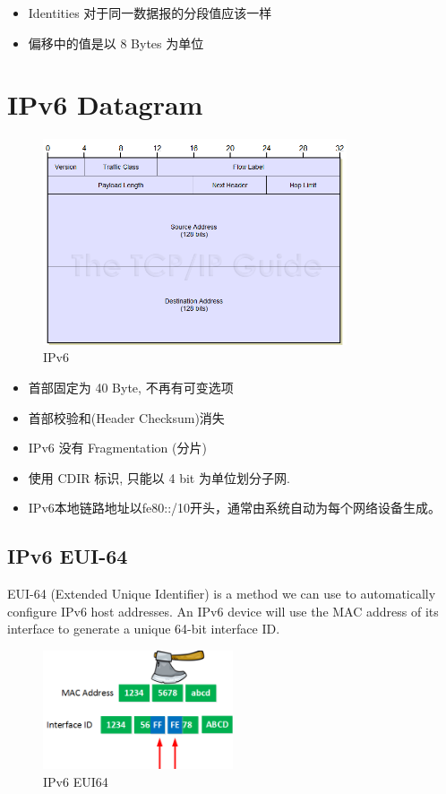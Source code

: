 \documentclass[a4paper]{report}
\begin{document}
\begin{itemize}
  \item Identities 对于同一数据报的分段值应该一样
  \item 偏移中的值是以 8 Bytes 为单位
\end{itemize}

\label{sec:ip_fragment}

\section{IPv6 Datagram}
\begin{figure}[H]
\centering
\includegraphics[width=0.8\textwidth]{ipv6format.png}
\caption{IPv6}
\end{figure}
\begin{itemize}
  \item 首部固定为 40 Byte, 不再有可变选项
  \item 首部校验和(Header Checksum)消失
  \item IPv6 没有 Fragmentation (分片)
  \item 使用 CDIR 标识, 只能以 4 bit 为单位划分子网. 
  \item IPv6本地链路地址以fe80::/10开头，通常由系统自动为每个网络设备生成。
\end{itemize}
\subsection{IPv6 EUI-64}
EUI-64 (Extended Unique Identifier) is a method we can use to automatically configure IPv6 host addresses. An IPv6 device will use the MAC address of its interface to generate a unique 64-bit interface ID. 

\begin{figure}[H]
\centering
\includegraphics[width=0.5\textwidth]{ipv6_eui.png}
\caption{IPv6 EUI64}
\end{figure}
\end{document}
